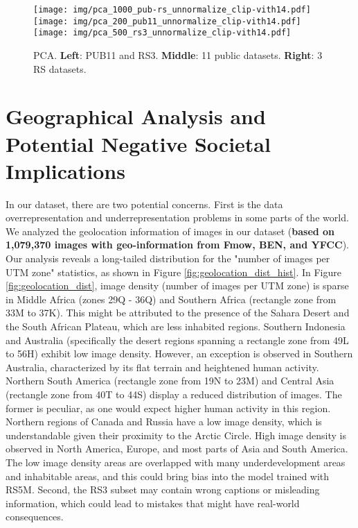 \documentclass[journal]{IEEEtran}
\begin{document}
\begin{figure}[htbp]
    \centering
    \texttt{[image: img/pca\_1000\_pub-rs\_unnormalize\_clip-vith14.pdf]}
    \texttt{[image: img/pca\_200\_pub11\_unnormalize\_clip-vith14.pdf]}
    \texttt{[image: img/pca\_500\_rs3\_unnormalize\_clip-vith14.pdf]}
    \caption{PCA. \textbf{Left}: PUB11 and RS3. \textbf{Middle}: 11 public datasets. \textbf{Right}: 3 RS datasets.}
    \label{fig:pca}
\end{figure}

\section{Geographical Analysis and Potential Negative Societal Implications}
In our dataset, there are two potential concerns. First is the data overrepresentation and underrepresentation problems in some parts of the world. We analyzed the geolocation information of images in our dataset (\textbf{based on 1,079,370 images with geo-information from Fmow, BEN, and YFCC}). Our analysis reveals a long-tailed distribution for the "number of images per UTM zone" statistics, as shown in Figure \ref{fig:geolocation_dist_hist}. In Figure \ref{fig:geolocation_dist}, image density (number of images per UTM zone) is sparse in Middle Africa (zones 29Q - 36Q) and Southern Africa (rectangle zone from 33M to 37K). This might be attributed to the presence of the Sahara Desert and the South African Plateau, which are less inhabited regions. Southern Indonesia and Australia (specifically the desert regions spanning a rectangle zone from 49L to 56H) exhibit low image density. However, an exception is observed in Southern Australia, characterized by its flat terrain and heightened human activity. Northern South America (rectangle zone from 19N to 23M) and Central Asia (rectangle zone from 40T to 44S) display a reduced distribution of images. The former is peculiar, as one would expect higher human activity in this region. Northern regions of Canada and Russia have a low image density, which is understandable given their proximity to the Arctic Circle. High image density is observed in North America, Europe, and most parts of Asia and South America. The low image density areas are overlapped with many underdevelopment areas and inhabitable areas, and this could bring bias into the model trained with RS5M. Second, the RS3 subset may contain wrong captions or misleading information, which could lead to mistakes that might have real-world consequences. 
\end{document}
